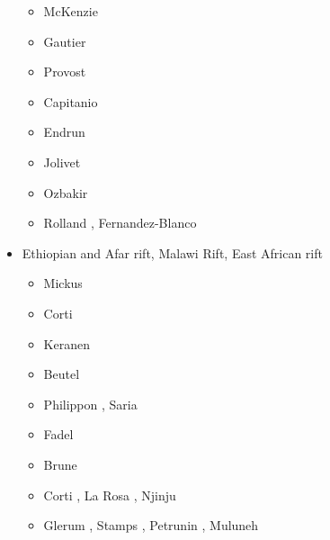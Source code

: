 \begin{itemize}
\begin{scriptsize}
\begin{itemize}
\item[\nineteenseventyeight] McKenzie \cite{mcke78b}
\item[\nineteenninetynine] Gautier \etal \cite{gabm99}
\item[\twothousandthree] Provost \etal \cite{prch03}
\item[\twothousandten] Capitanio \etal \cite{cazf10}
\item[\twothousandeleven] Endrun \etal \cite{enlm11}
\item[\twothousandthirteen] Jolivet \etal \cite{jofh13}
\item[\twothousandseventeen] Ozbakir \etal \cite{ozgw17}
\item[\twothousandtwenty] Rolland \etal \cite{rohb20}, Fernandez-Blanco \etal \cite{femb20}
\end{itemize}
\end{scriptsize}

\item{Ethiopian and Afar rift, Malawi Rift, East African rift} 

\begin{scriptsize}
\begin{itemize}
\item[\twothousandseven] Mickus \etal \cite{mitk07}
\item[\twothousandeight] Corti \cite{cort08}
\item[\twothousandnine] Keranen \etal \cite{kekj09}
\item[\twothousandten] Beutel \etal \cite{beve10}
\item[\twothousandfourteen] Philippon \etal \cite{phcs14}, Saria \etal \cite{sacs14}
\item[\twothousandfifteen] Fadel \etal \cite{favk15}
\item[\twothousandseventeen] Brune \etal \cite{brcr17} 
\item[\twothousandnineteen] Corti \etal \cite{cocf19}, La Rosa \etal \cite{lapk19}, Njinju \etal \cite{njas19}
\item[\twothousandtwenty] Glerum \etal \cite{glbs20}, Stamps \etal \cite{stkf20}, 
                          Petrunin \etal \cite{peke20}, Muluneh \etal \cite{mubi20}
\end{itemize}
\end{scriptsize}


\end{itemize}
